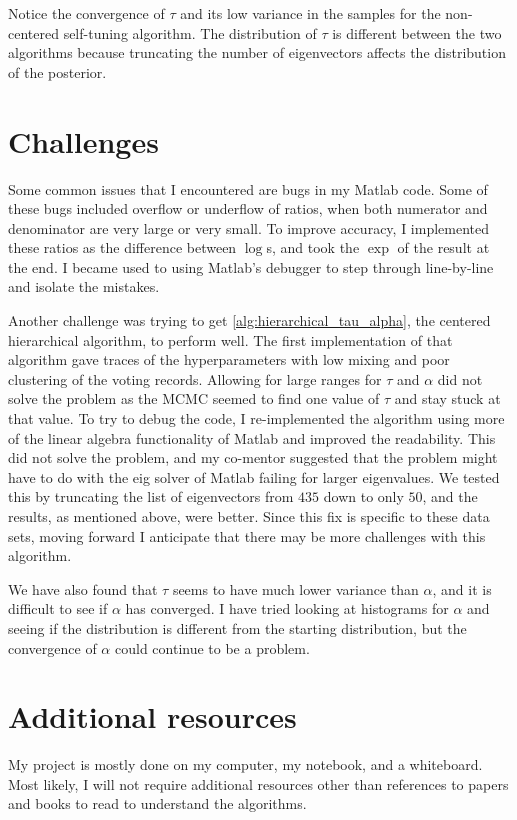 \documentclass{siamart1116}
\begin{document}
Notice the convergence of $\tau$ and its low variance in the samples for the non-centered self-tuning algorithm. The distribution of $\tau$ is different between the two algorithms because truncating the number of eigenvectors affects the distribution of the posterior.

\section{Challenges}
Some common issues that I encountered are bugs in my Matlab code. Some of these bugs included overflow or underflow of ratios, when both numerator and denominator are very large or very small. To improve accuracy, I implemented these ratios as the difference between $\log$s, and took the $\exp$ of the result at the end. I became used to using Matlab's debugger to step through line-by-line and isolate the mistakes.

Another challenge was trying to get \cref{alg:hierarchical_tau_alpha}, the centered hierarchical algorithm, to perform well. The first implementation of that algorithm gave traces of the hyperparameters with low mixing and poor clustering of the voting records. Allowing for large ranges for $\tau$ and $\alpha$ did not solve the problem as the MCMC seemed to find one value of $\tau$ and stay stuck at that value. To try to debug the code, I re-implemented the algorithm using more of the linear algebra functionality of Matlab and improved the readability. This did not solve the problem, and my co-mentor suggested that the problem might have to do with the eig solver of Matlab failing for larger eigenvalues. We tested this by truncating the list of eigenvectors from $435$ down to only $50$, and the results, as mentioned above, were better. Since this fix is specific to these data sets, moving forward I anticipate that there may be more challenges with this algorithm.

We have also found that $\tau$ seems to have much lower variance than $\alpha$, and it is difficult to see if $\alpha$ has converged. I have tried looking at histograms for $\alpha$ and seeing if the distribution is different from the starting distribution, but the convergence of $\alpha$ could continue to be a problem.

\section{Additional resources}
My project is mostly done on my computer, my notebook, and a whiteboard. Most likely, I will not require additional resources other than references to papers and books to read to understand the algorithms.



\end{document}

